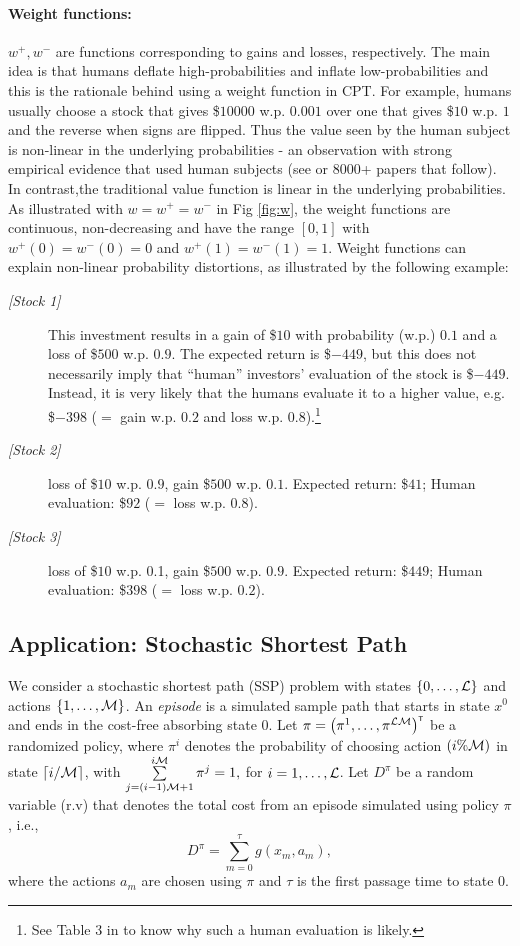 \documentclass[11pt,letterpaper,english]{article}
\begin{document}
\paragraph{Weight functions:} $w^+, w^-$ are functions corresponding to gains and losses, respectively. 
The main idea is that humans deflate high-probabilities and inflate low-probabilities and this is the rationale behind using a weight function in CPT.
For example, humans usually choose a stock that gives \$$10000$ w.p. $0.001$ over one that gives \$$10$ w.p. $1$ and the reverse when signs are flipped. 
Thus the value seen by the human subject is non-linear in the underlying probabilities - an observation with strong empirical evidence that used human subjects (see \cite{tversky1992advances} or $8000$+ papers that follow).  In contrast,the traditional value function is linear in the underlying probabilities. 
As illustrated with $w=w^+=w^-$ in Fig \ref{fig:w}, the weight functions are continuous, non-decreasing and have the range $[0,1]$ with $w^+(0)=w^-(0)=0$ and $w^+(1)=w^-(1)=1$. Weight functions can explain non-linear probability distortions, as illustrated by the following example: 
\begin{description}
 \item[\textit{[Stock 1]}] This investment results in a gain of \$$10$ with probability (w.p.) $0.1$ and a loss of \$$500$ w.p. $0.9$. The expected return is \$$-449$, but this does not necessarily imply that ``human'' investors' evaluation of the stock is \$$-449$. Instead, it is very likely that the humans evaluate it to a higher value, e.g. \$$-398$ ($=$ gain w.p. $0.2$ and loss w.p. $0.8$).\footnote{See Table 3 in \cite{tversky1992advances} to know why such a human evaluation is likely.}
\item[\textit{[Stock 2]}] loss of \$$10$ w.p. $0.9$, gain \$$500$ w.p. $0.1$. Expected return: \$$41$; Human evaluation: \$$92$ ($=$ loss w.p. $0.8$).
\item[\textit{[Stock 3]}] loss of \$$10$ w.p. 0.1, gain \$$500$ w.p. $0.9$. Expected return: \$$449$; Human evaluation: \$$398$ ($=$ loss w.p. $0.2$). 
\end{description}


\subsection{Application: Stochastic Shortest Path}
We consider a stochastic shortest path (SSP) problem with states $\{0,\ldots,\mathcal{L}\}$ and actions $\{1,\ldots,\mathcal{M}\}$. 
An \textit{episode} is a simulated sample path that starts in state $x^0$ and ends in the cost-free absorbing state $0$. 
Let $\pi=\left(\pi^{1},\ldots,\pi^{\mathcal{L}\mathcal{M}}\right)^\mathsf{\scriptscriptstyle T}$ be a randomized policy, where $\pi^{i}$ denotes the probability of choosing action $(i\% \mathcal{M})$ in state $\left \lceil{i/\mathcal{M}}\right \rceil$, with $\sum\limits_{j=(i-1)\mathcal{M}+1}^{i\mathcal{M}} \pi^{j} = 1,$ for $i=1,\ldots,\mathcal{L}$. 
Let $D^\pi$ be a random variable (r.v) that denotes the total cost from an episode simulated using policy $\pi$, i.e.,
$$ D^\pi = \sum\limits_{m=0}^{\tau} g(x_m,a_m), $$
where the actions $a_m$ are chosen using  $\pi$ and
$\tau$ is the first passage time to state $0$. 
\end{document}

